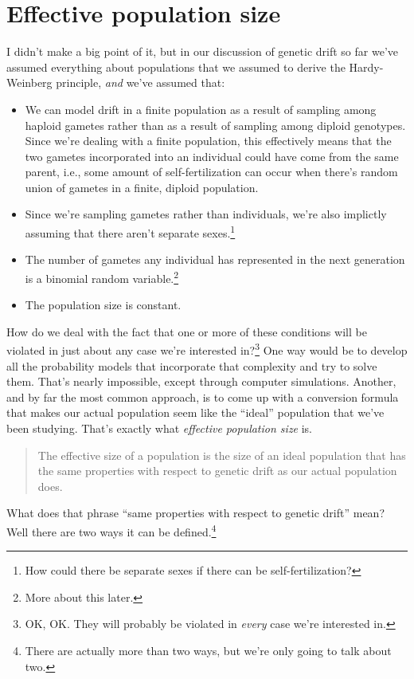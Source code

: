 \section*{Effective population size}

I didn't make a big point of it, but in our discussion of genetic
drift so far we've assumed everything about populations that we
assumed to derive the Hardy-Weinberg principle, {\it and\/} we've
assumed that:

\begin{itemize}

\item We can model drift in a finite population as a result of
  sampling among haploid gametes rather than as a result of sampling
  among diploid genotypes. Since we're dealing with a finite
  population, this effectively means that the two gametes incorporated
  into an individual could have come from the same parent, i.e., some
  amount of self-fertilization can occur when there's random union of
  gametes in a finite, diploid population.

\item Since we're sampling gametes rather than individuals, we're also
  implictly assuming that there aren't separate sexes.\footnote{How
    could there be separate sexes if there can be self-fertilization?}

\item The number of gametes any individual has represented in the next
  generation is a binomial random variable.\footnote{More about this
    later.}

\item The population size is constant.

\end{itemize}

How do we deal with the fact that one or more of these conditions will
be violated in just about any case we're interested in?\footnote{OK,
  OK. They will probably be violated in {\it every\/} case we're
  interested in.} One way would be to develop all the probability
models that incorporate that complexity and try to solve them. That's
nearly impossible, except through computer simulations. Another, and
by far the most common approach, is to come up with a conversion
formula that makes our actual population seem like the ``ideal''
population that we've been studying. That's exactly what {\it
  effective population size\/} is.
\begin{quote}
The effective size of a population is the size of an ideal population
that has the same properties with respect to genetic drift as our
actual population does.
\end{quote}
What does that phrase ``same properties with respect to genetic
drift'' mean? Well there are two ways it can be
defined.\footnote{There are actually more than two ways, but we're
  only going to talk about two.}

